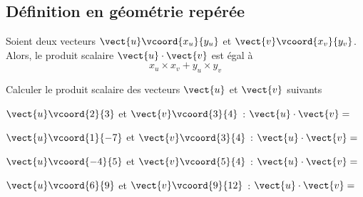 \documentclass{article}
\begin{document}
\subsection{Définition en géométrie repérée}
\begin{proposition}
Soient deux vecteurs $\vect{u}\vcoord{x_u}{y_u}$ et $\vect{v}\vcoord{x_v}{y_v}$. Alors, le produit scalaire $\vect{u} \cdot \vect{v}$ est égal à
\begin{equation*}
x_u \times x_v + y_u \times y_v    
\end{equation*}
\end{proposition}
\begin{example}
Calculer le produit scalaire des vecteurs $\vect{u}$ et $\vect{v}$ suivants
\begin{enumerate}[label=\emph{\alph*)}]
\begin{minipage}{0.45\textwidth}
\item $\vect{u}\vcoord{2}{3}$ et $\vect{v}\vcoord{3}{4}$ : $\vect{u} \cdot \vect{v} =$ \answersline
\item $\vect{u}\vcoord{1}{-7}$ et $\vect{v}\vcoord{3}{4}$ : $\vect{u} \cdot \vect{v} =$ \answersline
\end{minipage}
\hfill    
\begin{minipage}{0.45\textwidth}
\item $\vect{u}\vcoord{-4}{5}$ et $\vect{v}\vcoord{5}{4}$ : $\vect{u} \cdot \vect{v} =$ \answersline
\item $\vect{u}\vcoord{6}{9}$ et $\vect{v}\vcoord{9}{12}$ : $\vect{u} \cdot \vect{v} =$ \answersline
\end{minipage}
\end{enumerate}
\end{example}
\end{document}
